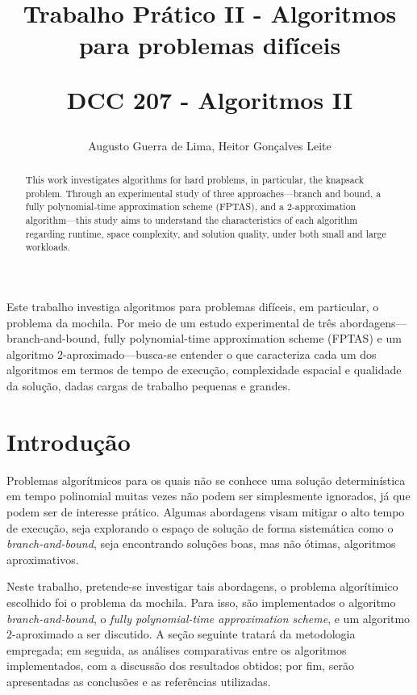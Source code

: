 \documentclass[12pt]{article}
\title{Trabalho Prático II - Algoritmos para problemas difíceis 

DCC 207 - Algoritmos II}
\author{Augusto Guerra de Lima, Heitor Gonçalves Leite}
\begin{document}
 

\maketitle

\begin{abstract}
This work investigates algorithms for hard problems, in particular, the knapsack problem. Through an experimental study of three approaches—branch and bound, a fully polynomial-time approximation scheme (FPTAS), and a \(2\)-approximation algorithm—this study aims to understand the characteristics of each algorithm regarding runtime, space complexity, and solution quality, under both small and large workloads.
\end{abstract}
     
\begin{resumo} 
Este trabalho investiga algoritmos para problemas difíceis, em particular, o problema da mochila. Por meio de um estudo experimental de três abordagens—branch-and-bound, fully polynomial-time approximation scheme (FPTAS) e um algoritmo \(2\)-aproximado—busca-se entender o que caracteriza cada um dos algoritmos em termos de tempo de execução, complexidade espacial e qualidade da solução, dadas cargas de trabalho pequenas e grandes.
\end{resumo}


\section{Introdução}

Problemas algorítmicos para os quais não se conhece uma solução determinística em tempo polinomial muitas vezes não podem ser simplesmente ignorados, já que podem ser de interesse prático. Algumas abordagens visam mitigar o alto tempo de execução, seja explorando o espaço de solução de forma sistemática como o \textit{branch-and-bound}, seja encontrando soluções boas, mas não ótimas, algoritmos aproximativos.

Neste trabalho, pretende-se investigar tais abordagens, o problema algorítimico escolhido foi o problema da mochila. Para isso, são implementados o algoritmo \textit{branch-and-bound}, o \textit{fully polynomial-time approximation scheme}, e um algoritmo \(2\)-aproximado a ser discutido. A seção seguinte tratará da metodologia empregada; em seguida, as análises comparativas entre os algoritmos implementados, com a discussão dos resultados obtidos; por fim, serão apresentadas as conclusões e as referências utilizadas.
\end{document}
